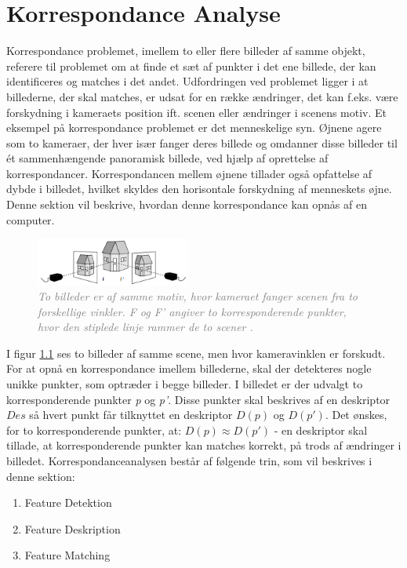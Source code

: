 \chapter{Korrespondance Analyse} \label{sec:Kor}
Korrespondance problemet, imellem to eller flere billeder af samme objekt, referere til problemet om at finde et sæt af punkter i det ene billede, der kan identificeres og matches i det andet.
Udfordringen ved problemet ligger i at billederne, der skal matches, er udsat for en række ændringer, det kan f.eks. være forskydning i kameraets position ift. scenen eller  ændringer i scenens motiv. Et eksempel på korrespondance problemet er det menneskelige syn. Øjnene agere som to kameraer, der hver især fanger deres billede og omdanner disse billeder til ét sammenhængende panoramisk billede, ved hjælp af oprettelse af korrespondancer. Korrespondancen mellem øjnene tillader også opfattelse af dybde i billedet, hvilket skyldes den horisontale forskydning af menneskets øjne. Denne sektion vil beskrive, hvordan denne korrespondance kan opnås af en computer.
\begin{figure}[H]
    \centering
    \includegraphics[width=0.45\textwidth]{fig/3.png}
     \vspace{-1em}
    \begin{center}    
       \caption{\textcolor{gray}{\footnotesize \textit{To billeder er af samme motiv, hvor kameraet fanger scenen fra to forskellige vinkler. F og F' angiver to korresponderende punkter, hvor den stiplede linje rammer de to scener \cite{kim}.}}}
    \label{fig:1}
     \end{center}
     \vspace{-2.5em}
  \end{figure} \noindent
I figur \ref{fig:1} ses to billeder af samme scene, men hvor kameravinklen er forskudt. For at opnå en korrespondance imellem billederne, skal der detekteres nogle unikke punkter, som optræder i begge billeder. I billedet er der udvalgt to korresponderende punkter \textit{p} og \textit{p'}. Disse punkter skal beskrives af en deskriptor $Des$ så hvert punkt får tilknyttet en deskriptor $D(p)$ og $D(p')$. Det ønskes, for to korresponderende punkter, at: $D(p)\approx D(p')$ - en deskriptor skal tillade, at korresponderende punkter kan matches korrekt, på trods af ændringer i billedet. Korrespondanceanalysen består af følgende trin, som vil beskrives i denne sektion:
\begin{enumerate}
\item{Feature Detektion}
\item{Feature Deskription}
\item{Feature Matching}
\end{enumerate}
